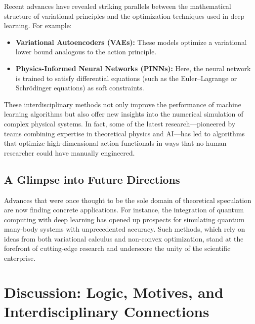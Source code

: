 \documentclass[11pt,a4paper]{article}
\begin{document}
Recent advances have revealed striking parallels between the mathematical structure of variational principles and the optimization techniques used in deep learning. For example:
\begin{itemize}
    \item \textbf{Variational Autoencoders (VAEs):} These models optimize a variational lower bound analogous to the action principle.
    \item \textbf{Physics-Informed Neural Networks (PINNs):} Here, the neural network is trained to satisfy differential equations (such as the Euler--Lagrange or Schrödinger equations) as soft constraints.
\end{itemize}
These interdisciplinary methods not only improve the performance of machine learning algorithms but also offer new insights into the numerical simulation of complex physical systems. In fact, some of the latest research—pioneered by teams combining expertise in theoretical physics and AI—has led to algorithms that optimize high-dimensional action functionals in ways that no human researcher could have manually engineered.

\subsection{A Glimpse into Future Directions}

Advances that were once thought to be the sole domain of theoretical speculation are now finding concrete applications. For instance, the integration of quantum computing with deep learning has opened up prospects for simulating quantum many-body systems with unprecedented accuracy. Such methods, which rely on ideas from both variational calculus and non-convex optimization, stand at the forefront of cutting-edge research and underscore the unity of the scientific enterprise.

\section{Discussion: Logic, Motives, and Interdisciplinary Connections}
\end{document}
